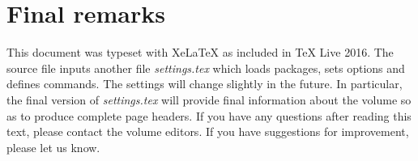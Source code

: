 \documentclass[11pt,twoside]{article}
\begin{document}
\section{Final remarks}

This document was typeset with XeLaTeX as included in TeX Live 2016.
The source file inputs another file \emph{settings.tex} which loads packages, sets options and defines commands.
The settings will change slightly in the future.
In particular, the final version of \emph{settings.tex} will provide final information about the volume so as to produce complete page headers.
If you have any questions after reading this text, please contact the volume editors.
If you have suggestions for improvement, please let us know.

\printbibliography
\end{document}
